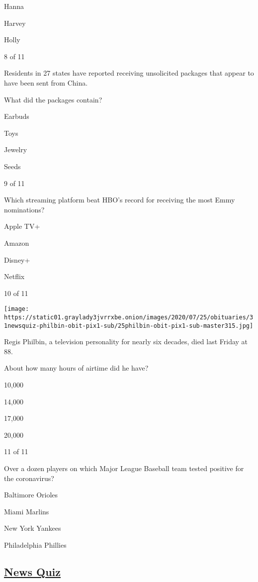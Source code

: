 Hanna

Harvey

Holly

8 of 11

Residents in 27 states have reported receiving unsolicited packages that
appear to have been sent from China.

What did the packages contain?

Earbuds

Toys

Jewelry

Seeds

9 of 11

Which streaming platform beat HBO's record for receiving the most Emmy
nominations?

Apple TV+

Amazon

Disney+

Netflix

10 of 11

\texttt{[image: https://static01.graylady3jvrrxbe.onion/images/2020/07/25/obituaries/31newsquiz-philbin-obit-pix1-sub/25philbin-obit-pix1-sub-master315.jpg]}

Regis Philbin, a television personality for nearly six decades, died
last Friday at 88.

About how many hours of airtime did he have?

10,000

14,000

17,000

20,000

11 of 11

Over a dozen players on which Major League Baseball team tested positive
for the coronavirus?

Baltimore Orioles

Miami Marlins

New York Yankees

Philadelphia Phillies

\hypertarget{news-quiz}{%
\subsection{\texorpdfstring{\href{https://www.nytimes3xbfgragh.onion/spotlight/news-quiz}{News
Quiz}}{News Quiz}}\label{news-quiz}}

